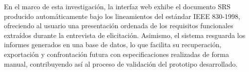 En el marco de esta investigación, la interfaz web exhibe el documento SRS producido automáticamente bajo los lineamientos del estándar 
IEEE 830-1998, ofreciendo al usuario una presentación ordenada de los requisitos funcionales extraídos durante la entrevista de elicitación. 
Asimismo, el sistema resguarda los informes generados en una base de datos, lo que facilita su recuperación, exportación y confrontación futura 
con especificaciones realizadas de forma manual, contribuyendo así al proceso de validación del prototipo desarrollado.